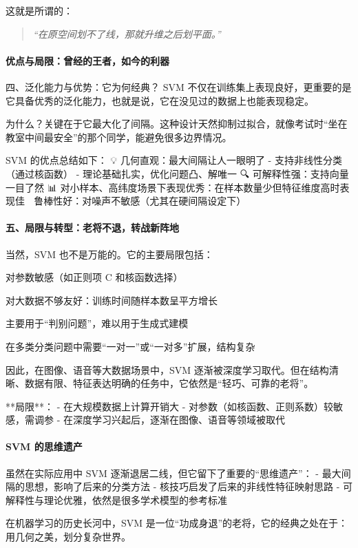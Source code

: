 这就是所谓的：
\begin{quote}
\itshape
“在原空间划不了线，那就升维之后划平面。”
\end{quote}


\paragraph*{优点与局限：曾经的王者，如今的利器}
{四、泛化能力与优势：它为何经典？}
SVM 不仅在训练集上表现良好，更重要的是它具备优秀的泛化能力，也就是说，它在没见过的数据上也能表现稳定。

为什么？关键在于它最大化了间隔。这种设计天然抑制过拟合，就像考试时“坐在教室中间最安全”的那个同学，能避免很多边界情况。

SVM 的优点总结如下：
💡 几何直观：最大间隔让人一眼明了
- 支持非线性分类（通过核函数）
- 理论基础扎实，优化问题凸、解唯一
🔍 可解释性强：支持向量一目了然
📊 对小样本、高纬度场景下表现优秀：在样本数量少但特征维度高时表现佳
🎯 鲁棒性好：对噪声不敏感（尤其在硬间隔设定下）


\paragraph*{五、局限与转型：老将不退，转战新阵地}
当然，SVM 也不是万能的。它的主要局限包括：

对参数敏感（如正则项 C 和核函数选择）

对大数据不够友好：训练时间随样本数呈平方增长

主要用于“判别问题”，难以用于生成式建模

在多类分类问题中需要“一对一”或“一对多”扩展，结构复杂

因此，在图像、语音等大数据场景中，SVM 逐渐被深度学习取代。但在结构清晰、数据有限、特征表达明确的任务中，它依然是“轻巧、可靠的老将”。

**局限**：
- 在大规模数据上计算开销大
- 对参数（如核函数、正则系数）较敏感，需调参
- 在深度学习兴起后，逐渐在图像、语音等领域被取代

\paragraph*{SVM 的思维遗产}

虽然在实际应用中 SVM 逐渐退居二线，但它留下了重要的“思维遗产”：
- 最大间隔的思想，影响了后来的分类方法
- 核技巧启发了后来的非线性特征映射思路
- 可解释性与理论优雅，依然是很多学术模型的参考标准

 在机器学习的历史长河中，SVM 是一位“功成身退”的老将，它的经典之处在于：用几何之美，划分复杂世界。

